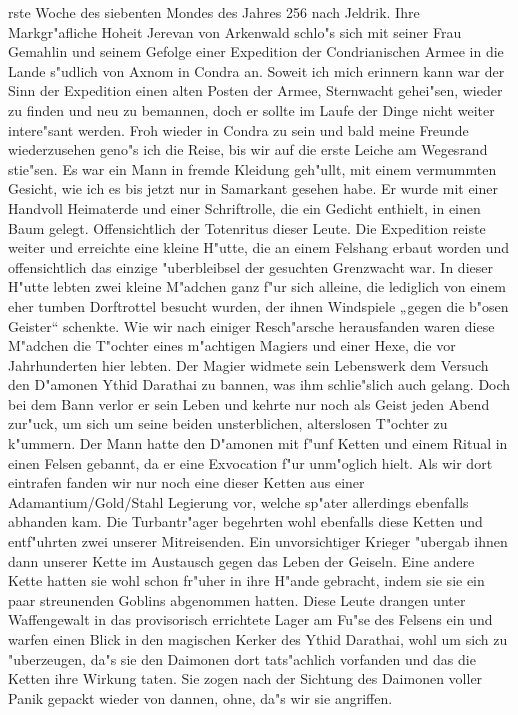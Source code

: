 \documentclass[a5paper,8pt]{book}
\begin{document}
rste Woche des siebenten Mondes des Jahres 256 nach Jeldrik. Ihre Markgr"afliche Hoheit Jerevan von Arkenwald schlo"s sich mit seiner Frau Gemahlin und seinem Gefolge einer Expedition der Condrianischen Armee in die Lande s"udlich von Axnom in Condra an. Soweit ich mich erinnern kann war der Sinn der Expedition einen alten Posten der Armee, Sternwacht gehei"sen, wieder zu finden und neu zu bemannen, doch er sollte im Laufe der Dinge nicht weiter intere"sant werden.
Froh wieder in Condra zu sein und bald meine Freunde wiederzusehen geno"s ich die Reise, bis wir auf die erste Leiche am Wegesrand stie"sen. Es war ein Mann in fremde Kleidung geh"ullt, mit einem vermummten Gesicht, wie ich es bis jetzt nur in Samarkant gesehen habe. Er wurde mit einer Handvoll Heimaterde und einer Schriftrolle, die ein Gedicht enthielt, in einen Baum gelegt. Offensichtlich der Totenritus dieser Leute. Die Expedition reiste weiter und erreichte eine kleine H"utte, die an einem Felshang erbaut worden und offensichtlich das einzige "uberbleibsel der gesuchten Grenzwacht war. In dieser H"utte lebten zwei kleine M"adchen ganz f"ur sich alleine, die lediglich von einem eher tumben Dorftrottel besucht wurden, der ihnen Windspiele „gegen die b"osen Geister“ schenkte.
Wie wir nach einiger Resch"arsche herausfanden waren diese M"adchen die T"ochter eines m"achtigen Magiers und einer Hexe, die vor Jahrhunderten hier lebten. Der Magier widmete sein Lebenswerk dem Versuch den D"amonen Ythid Darathai zu bannen, was ihm schlie"slich auch gelang. Doch bei dem Bann verlor er sein Leben und kehrte nur noch als Geist jeden Abend zur"uck, um sich um seine beiden unsterblichen, alterslosen T"ochter zu k"ummern.
Der Mann hatte den D"amonen mit f"unf Ketten und einem Ritual in einen Felsen gebannt, da er eine Exvocation f"ur unm"oglich hielt. Als wir dort eintrafen fanden wir nur noch eine dieser Ketten aus einer Adamantium/Gold/Stahl Legierung vor, welche sp"ater allerdings ebenfalls abhanden kam. Die Turbantr"ager begehrten wohl ebenfalls diese Ketten und entf"uhrten zwei unserer Mitreisenden. Ein unvorsichtiger Krieger "ubergab ihnen dann unserer Kette im Austausch gegen das Leben der Geiseln. Eine andere Kette hatten sie wohl schon fr"uher in ihre H"ande gebracht, indem sie sie ein paar streunenden Goblins abgenommen hatten.
Diese Leute drangen unter Waffengewalt in das provisorisch errichtete Lager am Fu"se des Felsens ein und warfen einen Blick in den magischen Kerker des Ythid Darathai, wohl um sich zu "uberzeugen, da"s sie den Daimonen dort tats"achlich vorfanden und das die Ketten ihre Wirkung taten. Sie zogen nach der Sichtung des Daimonen voller Panik gepackt wieder von dannen, ohne, da"s wir sie angriffen.
\end{document}
